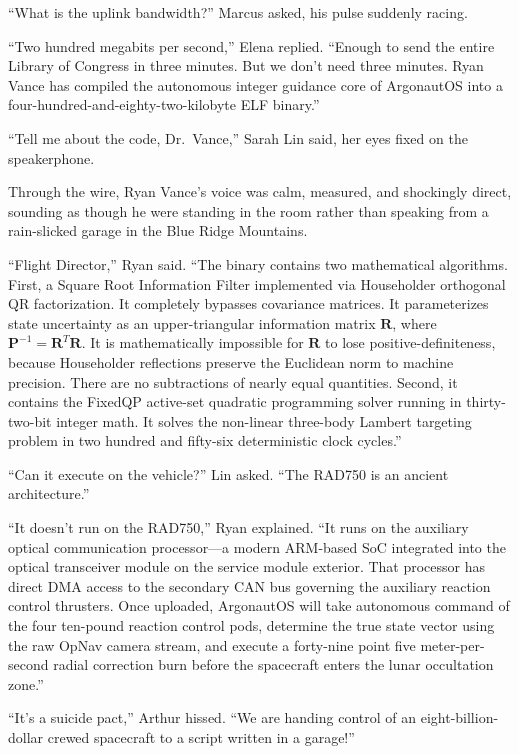 \documentclass[12pt,twoside,openright]{book}
\begin{document}
``What is the uplink bandwidth?'' Marcus asked, his pulse suddenly
racing.

``Two hundred megabits per second,'' Elena replied. ``Enough to send the
entire Library of Congress in three minutes. But we don't need three
minutes. Ryan Vance has compiled the autonomous integer guidance core of
ArgonautOS into a four-hundred-and-eighty-two-kilobyte ELF binary.''

``Tell me about the code, Dr.~Vance,'' Sarah Lin said, her eyes fixed on
the speakerphone.

Through the wire, Ryan Vance's voice was calm, measured, and shockingly
direct, sounding as though he were standing in the room rather than
speaking from a rain-slicked garage in the Blue Ridge Mountains.

``Flight Director,'' Ryan said. ``The binary contains two mathematical
algorithms. First, a Square Root Information Filter implemented via
Householder orthogonal QR factorization. It completely bypasses
covariance matrices. It parameterizes state uncertainty as an
upper-triangular information matrix \(\mathbf{R}\), where
\(\mathbf{P}^{-1} = \mathbf{R}^T \mathbf{R}\). It is mathematically
impossible for \(\mathbf{R}\) to lose positive-definiteness, because
Householder reflections preserve the Euclidean norm to machine
precision. There are no subtractions of nearly equal quantities. Second,
it contains the FixedQP active-set quadratic programming solver running
in thirty-two-bit integer math. It solves the non-linear three-body
Lambert targeting problem in two hundred and fifty-six deterministic
clock cycles.''

``Can it execute on the vehicle?'' Lin asked. ``The RAD750 is an ancient
architecture.''

``It doesn't run on the RAD750,'' Ryan explained. ``It runs on the
auxiliary optical communication processor---a modern ARM-based SoC
integrated into the optical transceiver module on the service module
exterior. That processor has direct DMA access to the secondary CAN bus
governing the auxiliary reaction control thrusters. Once uploaded,
ArgonautOS will take autonomous command of the four ten-pound reaction
control pods, determine the true state vector using the raw OpNav camera
stream, and execute a forty-nine point five meter-per-second radial
correction burn before the spacecraft enters the lunar occultation
zone.''

``It's a suicide pact,'' Arthur hissed. ``We are handing control of an
eight-billion-dollar crewed spacecraft to a script written in a
garage!''
\end{document}
